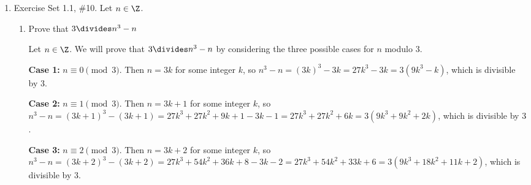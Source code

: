 \begin{enumerate}
\begin{subanswer}
    \textbf{Forward direction:} Assume $a^{m}-1 \divides a^{n}-1$. We will show that $m \divides n$.
    
    Let $n = qm + r$ where $0 \leq r < m$ (division algorithm). Then
    \[
      a^{n} - 1 = a^{qm + r} - 1 = a^{r}(a^{qm}) - 1 = a^{r}(a^{m})^{q} - 1.
    \]
    
    Since $a^{m} - 1 \divides a^{n} - 1$, and $a^{m} - 1 \divides (a^{m})^{q} - 1$ (by the formula for geometric series), we have
    \[
      a^{m} - 1 \divides a^{r}(a^{m})^{q} - a^{r} = a^{r}((a^{m})^{q} - 1).
    \]
    
    If $r > 0$, then $a^{r} > 1$ and $a^{m} - 1$ cannot divide $a^{n} - 1$ because the remainder would be $a^{r} - 1 \geq 0$. Therefore, $r = 0$, which means $m \divides n$.
    
    \textbf{Reverse direction:} Assume $m \divides n$. Then there exists an integer $k$ such that $n = mk$. We have
    \[
      a^{n} - 1 = a^{mk} - 1 = (a^{m})^{k} - 1.
    \]
    
    By the formula for geometric series, $(a^{m})^{k} - 1 = (a^{m} - 1)((a^{m})^{k-1} + (a^{m})^{k-2} + \cdots + a^{m} + 1)$. Therefore, $a^{m} - 1 \divides a^{n} - 1$.
    
    Hence, $a^{m} - 1 \divides a^{n} - 1$ if and only if $m \divides n$.
  \end{subanswer}

  \newpage

  \item Exercise Set 1.1, \#10. Let $n\in \Z$.
  \begin{enumerate}
    \item Prove that $3\divides n^{3}-n$
    \begin{subanswer}
      Let $n \in \Z$. We will prove that $3 \divides n^{3} - n$ by considering the three possible cases for $n$ modulo $3$.
      
      \textbf{Case 1:} $n \equiv 0 \pmod{3}$. Then $n = 3k$ for some integer $k$, so $n^{3} - n = (3k)^{3} - 3k = 27k^{3} - 3k = 3(9k^{3} - k)$, which is divisible by $3$.
      
      \textbf{Case 2:} $n \equiv 1 \pmod{3}$. Then $n = 3k + 1$ for some integer $k$, so $n^{3} - n = (3k + 1)^{3} - (3k + 1) = 27k^{3} + 27k^{2} + 9k + 1 - 3k - 1 = 27k^{3} + 27k^{2} + 6k = 3(9k^{3} + 9k^{2} + 2k)$, which is divisible by $3$.
      
      \textbf{Case 3:} $n \equiv 2 \pmod{3}$. Then $n = 3k + 2$ for some integer $k$, so $n^{3} - n = (3k + 2)^{3} - (3k + 2) = 27k^{3} + 54k^{2} + 36k + 8 - 3k - 2 = 27k^{3} + 54k^{2} + 33k + 6 = 3(9k^{3} + 18k^{2} + 11k + 2)$, which is divisible by $3$.
      

\end{subanswer}
\end{enumerate}
\end{enumerate}
